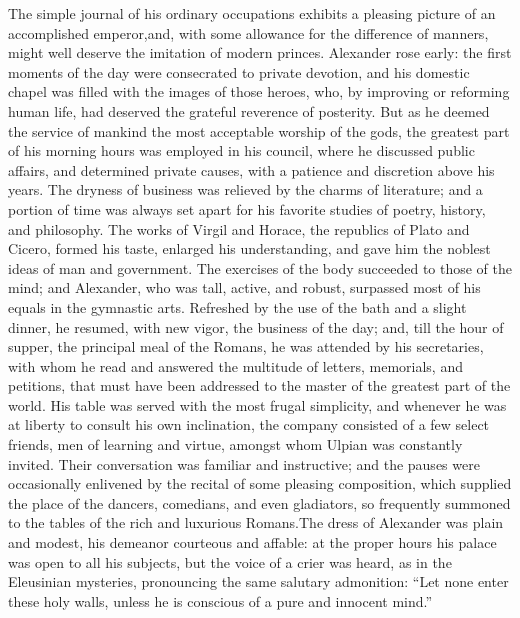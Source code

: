 The simple journal of his ordinary occupations exhibits a
pleasing picture of an accomplished emperor,\footnotemark[69] and, with some
allowance for the difference of manners, might well deserve the
imitation of modern princes. Alexander rose early: the first
moments of the day were consecrated to private devotion, and his
domestic chapel was filled with the images of those heroes, who,
by improving or reforming human life, had deserved the grateful
reverence of posterity. But as he deemed the service of mankind
the most acceptable worship of the gods, the greatest part of his
morning hours was employed in his council, where he discussed
public affairs, and determined private causes, with a patience
and discretion above his years. The dryness of business was
relieved by the charms of literature; and a portion of time was
always set apart for his favorite studies of poetry, history, and
philosophy. The works of Virgil and Horace, the republics of
Plato and Cicero, formed his taste, enlarged his understanding,
and gave him the noblest ideas of man and government. The
exercises of the body succeeded to those of the mind; and
Alexander, who was tall, active, and robust, surpassed most of
his equals in the gymnastic arts. Refreshed by the use of the
bath and a slight dinner, he resumed, with new vigor, the
business of the day; and, till the hour of supper, the principal
meal of the Romans, he was attended by his secretaries, with whom
he read and answered the multitude of letters, memorials, and
petitions, that must have been addressed to the master of the
greatest part of the world. His table was served with the most
frugal simplicity, and whenever he was at liberty to consult his
own inclination, the company consisted of a few select friends,
men of learning and virtue, amongst whom Ulpian was constantly
invited. Their conversation was familiar and instructive; and the
pauses were occasionally enlivened by the recital of some
pleasing composition, which supplied the place of the dancers,
comedians, and even gladiators, so frequently summoned to the
tables of the rich and luxurious Romans.\footnotemark[70] The dress of
Alexander was plain and modest, his demeanor courteous and
affable: at the proper hours his palace was open to all his
subjects, but the voice of a crier was heard, as in the
Eleusinian mysteries, pronouncing the same salutary admonition:
“Let none enter these holy walls, unless he is conscious of a
pure and innocent mind.”\footnotemark[71]


